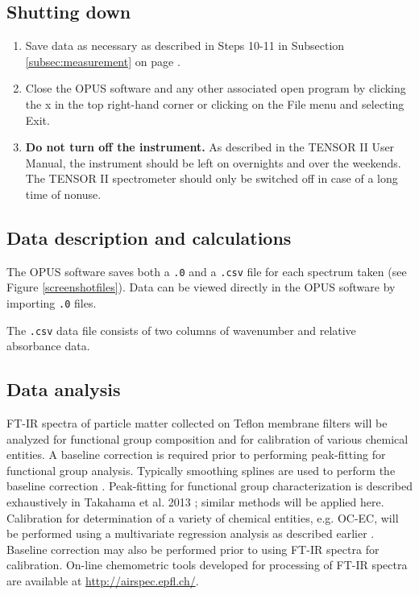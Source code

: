 \subsection{Shutting down}
\begin{enumerate}
    \item Save data as necessary as described in Steps 10-11 in Subsection \ref{subsec:measurement} on page \pageref{subsec:measurement}.
    \item Close the OPUS software and any other associated open program by clicking the x in the top right-hand corner or clicking on the File menu and selecting Exit.
    \item \textbf{Do not turn off the instrument.} As described in the TENSOR II User Manual, the instrument should be left on overnights and over the weekends. The TENSOR II spectrometer should only be switched off in case of a long time of nonuse.
\end{enumerate}

\subsection{Data description and calculations}
The OPUS software saves both a \verb|.0| and a \verb|.csv| file for each spectrum taken (see Figure \ref{screenshotfiles}). Data can be viewed directly in the OPUS software by importing \verb|.0| files.

The \verb|.csv| data file consists of two columns of wavenumber and relative absorbance data. 

\subsection{Data analysis}
FT-IR spectra of particle matter collected on Teflon membrane filters will be analyzed for functional group composition and for calibration of various chemical entities. A baseline correction is required prior to performing peak-fitting for functional group analysis. Typically smoothing splines are used to perform the baseline correction \cite{Kuzmiakova1}. Peak-fitting for functional group characterization is described exhaustively in Takahama et al. 2013 \cite{Satoshi1}; similar methods will be applied here. Calibration for determination of a variety of chemical entities, e.g. OC-EC, will be performed using a multivariate regression analysis as described earlier \cite{Reggente1}. Baseline correction may also be performed prior to using FT-IR spectra for calibration. On-line chemometric tools developed for processing of FT-IR spectra are available at \url{http://airspec.epfl.ch/}.

